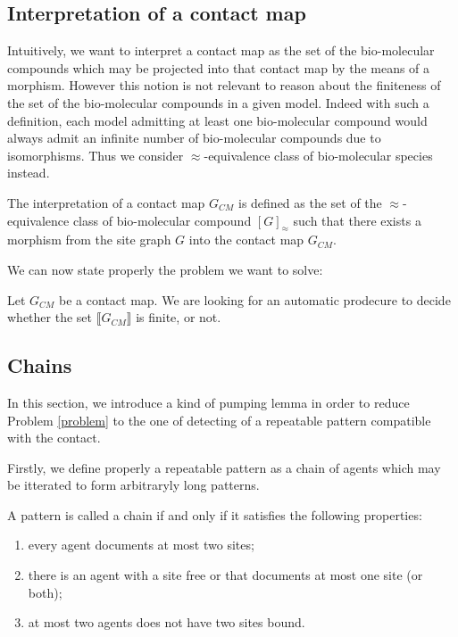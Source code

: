 \documentclass{entcs}
\newcommand{\graphsymb}{G}
\newcommand{\iso}{\approx}
\begin{document}
\subsection{Interpretation of a contact map}

Intuitively, we want to interpret a contact map as the set of the bio-molecular compounds which may be projected into that contact map by the means of a morphism. However this notion is not relevant to reason about the finiteness of the set of the bio-molecular compounds in  a given model. Indeed with such a  definition,  each model admitting at least one bio-molecular compound would always admit an infinite number of bio-molecular compounds due to isomorphisms. Thus we consider $\iso$-equivalence class of bio-molecular species instead.


\begin{defn}
The interpretation of a contact map $\graphsymb_{\textit{CM}}$ is defined as the set of the $\iso$-equivalence class of bio-molecular compound $[G]_{\iso}$ such that there exists a morphism from the site graph $G$ into the contact map $\graphsymb_{\textit{CM}}$.
\end{defn}

We can now state properly the problem we want to solve:
\begin{problem}\label{problem}
Let $\graphsymb_{\textit{CM}}$ be a contact map.
We are looking for an automatic prodecure to decide whether
the set $\llbracket \graphsymb_{\textit{CM}} \rrbracket$ is finite, or not.
\end{problem}

\subsection{Chains}

In this section, we introduce a kind of pumping lemma in order to reduce
Problem \ref{problem} to the one of detecting of  a repeatable pattern compatible with the contact.

Firstly, we define properly a repeatable pattern as a chain of agents which may be itterated to form arbitraryly long patterns.

\begin{defn}[Chain]
A pattern is called a chain if and only if it satisfies the following properties:
\begin{enumerate}
  \item every agent documents at most two sites;
  \item there is an agent with a site free or
  that documents at most one site (or both);
  \item at most two agents does not have two sites bound.
\end{enumerate}
\end{defn}
\end{document}
